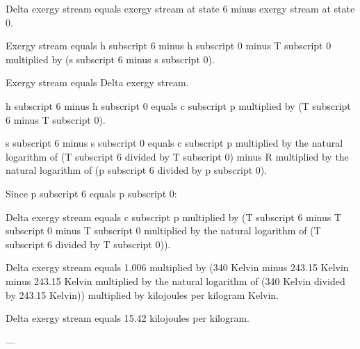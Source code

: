 Delta exergy stream equals exergy stream at state 6 minus exergy stream at state 0.  

Exergy stream equals h subscript 6 minus h subscript 0 minus T subscript 0 multiplied by (s subscript 6 minus s subscript 0).  

Exergy stream equals Delta exergy stream.  

h subscript 6 minus h subscript 0 equals c subscript p multiplied by (T subscript 6 minus T subscript 0).  

s subscript 6 minus s subscript 0 equals c subscript p multiplied by the natural logarithm of (T subscript 6 divided by T subscript 0) minus R multiplied by the natural logarithm of (p subscript 6 divided by p subscript 0).  

Since p subscript 6 equals p subscript 0:  

Delta exergy stream equals c subscript p multiplied by (T subscript 6 minus T subscript 0 minus T subscript 0 multiplied by the natural logarithm of (T subscript 6 divided by T subscript 0)).  

Delta exergy stream equals 1.006 multiplied by (340 Kelvin minus 243.15 Kelvin minus 243.15 Kelvin multiplied by the natural logarithm of (340 Kelvin divided by 243.15 Kelvin)) multiplied by kilojoules per kilogram Kelvin.  

Delta exergy stream equals 15.42 kilojoules per kilogram.  

---